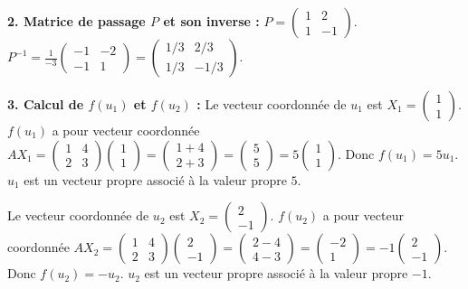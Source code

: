 \documentclass{report}
\begin{document}
\textbf{2. Matrice de passage $P$ et son inverse :}
$P = \begin{pmatrix} 1 & 2 \\ 1 & -1 \end{pmatrix}$.
$P^{-1} = \frac{1}{-3} \begin{pmatrix} -1 & -2 \\ -1 & 1 \end{pmatrix} = \begin{pmatrix} 1/3 & 2/3 \\ 1/3 & -1/3 \end{pmatrix}$.

\textbf{3. Calcul de $f(u_1)$ et $f(u_2)$ :}
Le vecteur coordonnée de $u_1$ est $X_1 = \begin{pmatrix} 1 \\ 1 \end{pmatrix}$.
$f(u_1)$ a pour vecteur coordonnée $AX_1 = \begin{pmatrix} 1 & 4 \\ 2 & 3 \end{pmatrix} \begin{pmatrix} 1 \\ 1 \end{pmatrix} = \begin{pmatrix} 1+4 \\ 2+3 \end{pmatrix} = \begin{pmatrix} 5 \\ 5 \end{pmatrix} = 5 \begin{pmatrix} 1 \\ 1 \end{pmatrix}$.
Donc $f(u_1) = 5u_1$. $u_1$ est un vecteur propre associé à la valeur propre $5$.

Le vecteur coordonnée de $u_2$ est $X_2 = \begin{pmatrix} 2 \\ -1 \end{pmatrix}$.
$f(u_2)$ a pour vecteur coordonnée $AX_2 = \begin{pmatrix} 1 & 4 \\ 2 & 3 \end{pmatrix} \begin{pmatrix} 2 \\ -1 \end{pmatrix} = \begin{pmatrix} 2-4 \\ 4-3 \end{pmatrix} = \begin{pmatrix} -2 \\ 1 \end{pmatrix} = -1 \begin{pmatrix} 2 \\ -1 \end{pmatrix}$.
Donc $f(u_2) = -u_2$. $u_2$ est un vecteur propre associé à la valeur propre $-1$.
\end{document}
